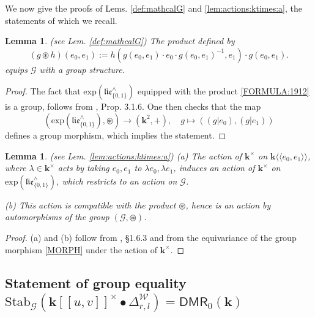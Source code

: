 \documentclass[10pt]{amsart}
\newtheorem{lem}[thm]{Lemma}
\numberwithin{equation}{subsection}
\begin{document}
We now give the proofs of Lems. \ref{def:mathcalG} and \ref{lem:actions:ktimes:a}, 
the statements of which we recall. 
\begin{lem}\label{def:mathcalG:w:proof} (see Lem. \ref{def:mathcalG})
The product defined by 
\begin{equation}\label{FORMULA:1912}
(g\circledast h)(e_0,e_1):=h(g(e_0,e_1)\cdot e_0\cdot g(e_0,e_1)^{-1},e_1)\cdot g(e_0,e_1). 
\end{equation}
equips $\mathcal G$ with a group structure. 
\end{lem}
\begin{proof}
The fact that $\mathrm{exp}(\mathfrak{lie}_{\{0,1\}}^\wedge)$ equipped with 
the product \eqref{FORMULA:1912} is a group, follows from \cite{R}, Prop. 3.1.6. 
One then checks that the map 
\begin{equation}\label{MORPH}
(\mathrm{exp}(\mathfrak{lie}_{\{0,1\}}^\wedge),\circledast)\to 
(\mathbf k^2,+),\quad g\mapsto((g|e_0),(g|e_1))
\end{equation}
defines a group morphism, which implies the statement.
\end{proof}

\begin{lem}\label{lem:actions:ktimes:a:w:proof} (see Lem. \ref{lem:actions:ktimes:a})
(a)   The action of $\mathbf k^\times$ on $\mathbf k\langle\langle e_0,e_1\rangle\rangle$,
where $\lambda\in\mathbf k^\times$ acts by taking $e_0,e_1$ to $\lambda e_0,\lambda e_1$, 
induces an action of $\mathbf k^\times$ on $\mathrm{exp}(\mathfrak{lie}_{\{0,1\}}^\wedge)$, 
which restricts to an action on $\mathcal G$. 

(b) This action is compatible with the product $\circledast$, hence is an action by 
automorphisms of the group $(\mathcal G,\circledast)$.  
\end{lem}

\begin{proof}
 (a) and (b) follow from \cite{EF2}, §1.6.3 and from the equivariance of the group morphism \eqref{MORPH} under 
 the action of $\mathbf k^\times$. 
\end{proof}



\subsection{Statement of group equality $\mathrm{Stab}_{\mathcal G}(\mathbf k[[u,v]]^\times\bullet\Delta^{\mathcal W}_{r,l}
)
=\mathsf{DMR}_0(\mathbf k)$}\label{sect:1:1}
\end{document}
